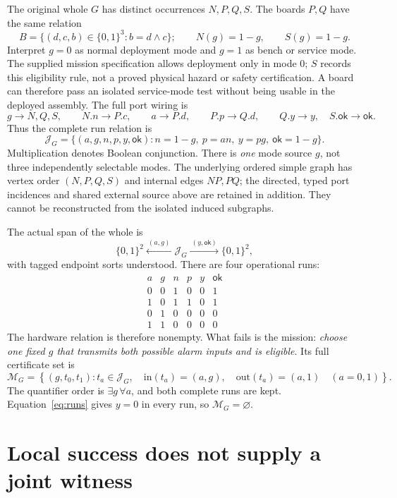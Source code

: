 \documentclass[11pt]{article}
\newcommand{\B}{\{0,1\}}
\newcommand{\JG}{\mathcal J_G}
\newcommand{\MG}{\mathcal M_G}
\newcommand{\ok}{\mathsf{ok}}
\begin{document}
The original whole $G$ has distinct occurrences $N,P,Q,S$. The boards $P,Q$ have
the same relation
\[
 B=\{(d,c,b)\in\B^3:b=d\land c\};
 \qquad N(g)=1-g,\qquad S(g)=1-g.
\]
Interpret $g=0$ as normal deployment mode and $g=1$ as bench or service mode.
The supplied mission specification allows deployment only in mode $0$;
$S$ records this eligibility rule, not a proved physical hazard or safety
certification. A board can therefore pass an isolated service-mode test without
being usable in the deployed assembly.
The full port wiring is
\[
 g\longrightarrow N,Q,S,\qquad N.n\longrightarrow P.c,
 \qquad a\longrightarrow P.d,\qquad P.p\longrightarrow Q.d,
 \qquad Q.y\longrightarrow y,\quad S.\ok\longrightarrow\ok.
\]
Thus the complete run relation is
\begin{equation}\label{eq:runs}
 \JG=\{(a,g,n,p,y,\ok):
 n=1-g,\ p=an,\ y=pg,\ \ok=1-g\}.
\end{equation}
Multiplication denotes Boolean conjunction. There is \emph{one} mode source
$g$, not three independently selectable modes. The underlying ordered simple
graph has vertex order $(N,P,Q,S)$ and internal edges $NP,PQ$; the directed,
typed port incidences and shared external source above are retained in addition.
They cannot be reconstructed from the isolated induced subgraphs.

The actual span of the whole is
\[
 \B^2\xleftarrow{\ (a,g)\ }\JG
       \xrightarrow{\ (y,\ok)\ }\B^2,
\]
with tagged endpoint sorts understood. There are four operational runs:
\[
\begin{array}{cc|cccc}
 a&g&n&p&y&\ok\\\hline
 0&0&1&0&0&1\\
 1&0&1&1&0&1\\
 0&1&0&0&0&0\\
 1&1&0&0&0&0
\end{array}
\]
The hardware relation is therefore nonempty. What fails is the mission:
\emph{choose one fixed $g$ that transmits both possible alarm inputs and is
eligible}. Its full certificate set is
\begin{equation}\label{eq:mission}
 \MG=\left\{(g,t_0,t_1):
 t_a\in\JG,\quad \mathrm{in}(t_a)=(a,g),\quad
 \mathrm{out}(t_a)=(a,1)\quad(a=0,1)\right\}.
\end{equation}
The quantifier order is $\exists g\,\forall a$, and both complete runs are kept.
Equation~\eqref{eq:runs} gives $y=0$ in every run, so $\MG=\varnothing$.

\section{Local success does not supply a joint witness}
\end{document}

